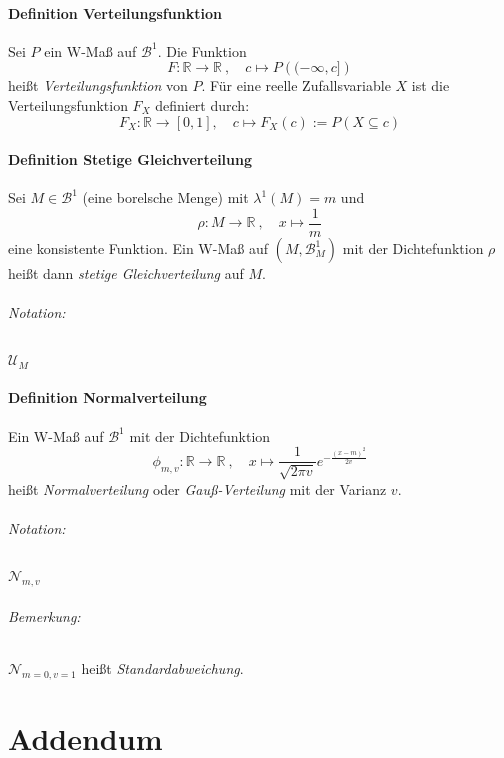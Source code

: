 \documentclass[12pt,a4paper]{article}
\begin{document}
	\subsection{Definition Verteilungsfunktion}
	Sei $P$ ein W-Maß auf $\mathcal{B}^1$. Die Funktion 
	$$F:\mathbb{R}\rightarrow\mathbb{R} \: , \quad c\longmapsto P\left((-\infty,c]\right)$$
	heißt \textit{Verteilungsfunktion} von $P$. Für eine reelle Zufallsvariable $X$ ist die Verteilungsfunktion $F_X$ definiert durch:
	$$F_X:\mathbb{R}\rightarrow[0,1], \quad c\longmapsto F_X(c):=P(X\subseteq c)$$
	
	\subsection{Definition Stetige Gleichverteilung}
	\label{defStetigeGleichverteilung}	
	Sei $M\in\mathcal{B}^1$ (eine borelsche Menge) mit $\lambda^1 (M)=m$ und 
	$$\rho : M\rightarrow\mathbb{R}\: , \quad x\longmapsto \frac{1}{m}$$
	eine konsistente Funktion. Ein W-Maß auf $(M,\mathcal{B}^1_M )$ mit der Dichtefunktion $\rho$ heißt dann \textit{stetige Gleichverteilung} auf $M$.
	\paragraph{Notation:} $\mathcal{U}_M$
	
	\subsection{Definition Normalverteilung}
	\label{defNormalverteilung}
	Ein W-Maß auf $\mathcal{B}^1$ mit der Dichtefunktion
	$$\phi_{m,v} : \mathbb{R}\rightarrow\mathbb{R} \: , \quad x\longmapsto \frac{1}{\sqrt{2\pi v}}e^{-\frac{(x-m)^2}{2v}}$$
	heißt \textit{Normalverteilung} oder \textit{Gauß-Verteilung} mit der Varianz $v$.
	\paragraph{Notation:} $\mathcal{N}_{m,v}$
	\paragraph{Bemerkung:}
	$\mathcal{N}_{m=0,v=1}$ heißt \textit{Standardabweichung}.
	
	
	
	\pagebreak
	
	\part{Addendum}
	
\end{document}
